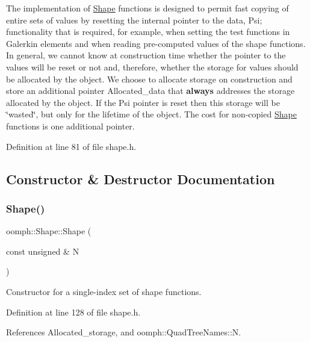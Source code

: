 The implementation of \hyperlink{classoomph_1_1Shape}{Shape} functions is designed to permit fast copying of entire sets of values by resetting the internal pointer to the data, Psi; functionality that is required, for example, when setting the test functions in Galerkin elements and when reading pre-\/computed values of the shape functions. In general, we cannot know at construction time whether the pointer to the values will be reset or not and, therefore, whether the storage for values should be allocated by the object. We choose to allocate storage on construction and store an additional pointer Allocated\+\_\+data that {\bfseries always} addresses the storage allocated by the object. If the Psi pointer is reset then this storage will be \char`\"{}wasted\char`\"{}, but only for the lifetime of the object. The cost for non-\/copied \hyperlink{classoomph_1_1Shape}{Shape} functions is one additional pointer. 

Definition at line 81 of file shape.\+h.



\subsection{Constructor \& Destructor Documentation}
\mbox{\label{classoomph_1_1Shape_aedb62dd7998071721057eab955ecc1f9}} 
\subsubsection{\texorpdfstring{Shape()}{Shape()}\hspace{0.1cm}{\footnotesize\ttfamily [1/4]}}
{\footnotesize\ttfamily oomph\+::\+Shape\+::\+Shape (\begin{DoxyParamCaption}\item[{const unsigned \&}]{N }\end{DoxyParamCaption})\hspace{0.3cm}{\ttfamily [inline]}}



Constructor for a single-\/index set of shape functions. 



Definition at line 128 of file shape.\+h.



References Allocated\+\_\+storage, and oomph\+::\+Quad\+Tree\+Names\+::N.

